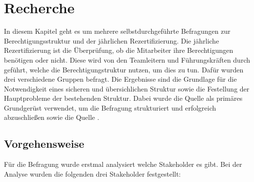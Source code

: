 \chapter{Recherche}
\label{ch:Recherche}
In diesem Kapitel geht es um mehrere selbstdurchgeführte Befragungen zur Berechtigungsstruktur und der jährlichen Rezertifizierung.
Die jährliche Rezertifizierung ist die Überprüfung, ob die Mitarbeiter ihre Berechtigungen benötigen oder nicht.
Diese wird von den Teamleitern und Führungskräften durch geführt, welche die Berechtigungstruktur nutzen, um dies zu tun.
Dafür wurden drei verschiedene Gruppen befragt.
Die Ergebnisse sind die Grundlage für die Notwendigkeit eines sicheren und übersichlichen Struktur sowie die Festellung der Hauptprobleme der bestehenden Struktur.
Dabei wurde die Quelle \cite{HowSurvey} als primäres Grundgerüst verwendet, um die Befragung strukturiert und erfolgreich abzuschließen sowie die Quelle \cite{Survey}.

\section{Vorgehensweise}
\label{sec:Vorgehensweise}
Für die Befragung wurde erstmal analysiert welche Stakeholder es gibt.
Bei der Analyse wurden die folgenden drei Stakeholder festgestellt:

